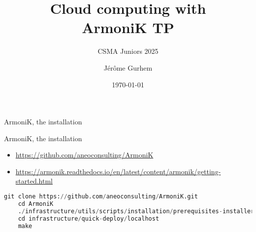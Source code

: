 \documentclass[10pt,aspectratio=1609]{beamer}
\begin{document}
\author{Jérôme Gurhem}
\title{Cloud computing with \\ ArmoniK TP}
\subtitle{CSMA Juniors 2025}
\date{\today}

\titlepage

\AtBeginSection[]
{
	\frame{\sectionpage}
}




\begin{section}{ArmoniK, the installation}
\begin{frame}[fragile]{ArmoniK, the installation}
  \begin{itemize}
    \item \url{https://github.com/aneoconsulting/ArmoniK}
    \item \url{https://armonik.readthedocs.io/en/latest/content/armonik/getting-started.html}
  \end{itemize}
  \begin{lstlisting}[language=Python, caption=ArmoniK installation TLDR]
    git clone https://github.com/aneoconsulting/ArmoniK.git
    cd ArmoniK
    ./infrastructure/utils/scripts/installation/prerequisites-installer.sh
    cd infrastructure/quick-deploy/localhost
    make
  \end{lstlisting}
\end{frame}
\end{section}
\end{document}
